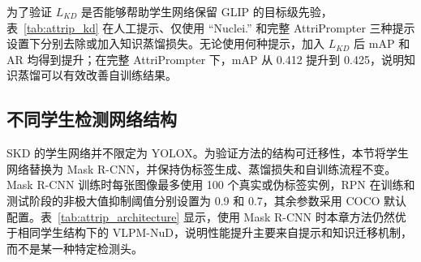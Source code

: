 为了验证 $L_{KD}$ 是否能够帮助学生网络保留 GLIP 的目标级先验，表~\ref{tab:attrip_kd} 在人工提示、仅使用 ``Nuclei.'' 和完整 AttriPrompter 三种提示设置下分别去除或加入知识蒸馏损失。无论使用何种提示，加入 $L_{KD}$ 后 mAP 和 AR 均得到提升；在完整 AttriPrompter 下，mAP 从 0.412 提升到 0.425，说明知识蒸馏可以有效改善自训练结果。

\begin{table}[t]
\caption{知识蒸馏损失 $L_{KD}$ 的消融实验。不使用 $L_{KD}$ 时，学生网络仅由检测损失 $L_{Det}$ 训练。最优结果以粗体表示。}
\label{tab:attrip_kd}
\begin{center}
\end{center}
\end{table}

\subsection{不同学生检测网络结构}

SKD 的学生网络并不限定为 YOLOX。为验证方法的结构可迁移性，本节将学生网络替换为 Mask R-CNN，并保持伪标签生成、蒸馏损失和自训练流程不变。Mask R-CNN 训练时每张图像最多使用 100 个真实或伪标签实例，RPN 在训练和测试阶段的非极大值抑制阈值分别设置为 0.9 和 0.7，其余参数采用 COCO 默认配置。表~\ref{tab:attrip_architecture} 显示，使用 Mask R-CNN 时本章方法仍然优于相同学生结构下的 VLPM-NuD，说明性能提升主要来自提示和知识迁移机制，而不是某一种特定检测头。

